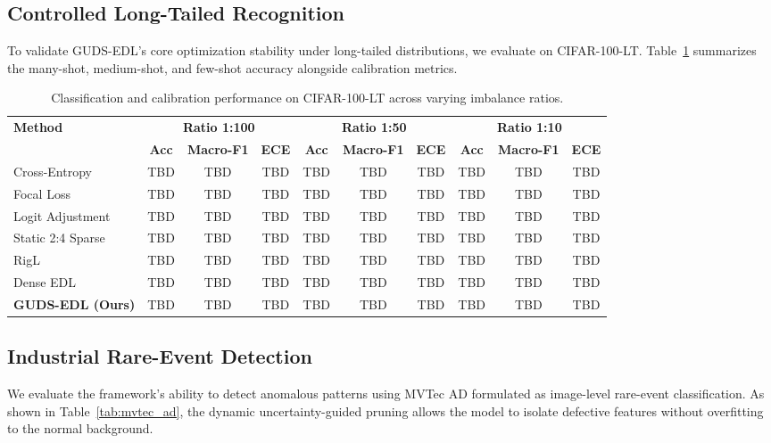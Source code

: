 \documentclass[letterpaper]{article} %
\begin{document}
\subsection{Controlled Long-Tailed Recognition}\label{subsec:cifar_results}
To validate GUDS-EDL's core optimization stability under long-tailed distributions, we evaluate on CIFAR-100-LT. Table~\ref{tab:cifar100_lt} summarizes the many-shot, medium-shot, and few-shot accuracy alongside calibration metrics.

\begin{table}[!ht]
\centering
\caption{Classification and calibration performance on CIFAR-100-LT across varying imbalance ratios.}
\label{tab:cifar100_lt}
\begin{tabular}{l ccc ccc ccc}
\toprule
\textbf{Method} & \multicolumn{3}{c}{\textbf{Ratio 1:100}} & \multicolumn{3}{c}{\textbf{Ratio 1:50}} & \multicolumn{3}{c}{\textbf{Ratio 1:10}} \\
\cmidrule(lr){2-4} \cmidrule(lr){5-7} \cmidrule(lr){8-10}
 & \textbf{Acc} & \textbf{Macro-F1} & \textbf{ECE} & \textbf{Acc} & \textbf{Macro-F1} & \textbf{ECE} & \textbf{Acc} & \textbf{Macro-F1} & \textbf{ECE} \\
\midrule
Cross-Entropy      & TBD & TBD & TBD & TBD & TBD & TBD & TBD & TBD & TBD \\
Focal Loss         & TBD & TBD & TBD & TBD & TBD & TBD & TBD & TBD & TBD \\
Logit Adjustment   & TBD & TBD & TBD & TBD & TBD & TBD & TBD & TBD & TBD \\
Static 2:4 Sparse  & TBD & TBD & TBD & TBD & TBD & TBD & TBD & TBD & TBD \\
RigL               & TBD & TBD & TBD & TBD & TBD & TBD & TBD & TBD & TBD \\
Dense EDL          & TBD & TBD & TBD & TBD & TBD & TBD & TBD & TBD & TBD \\
\midrule
\textbf{GUDS-EDL (Ours)} & TBD & TBD & TBD & TBD & TBD & TBD & TBD & TBD & TBD \\
\bottomrule
\end{tabular}
\end{table}

\subsection{Industrial Rare-Event Detection}\label{subsec:mvtec_results}
We evaluate the framework's ability to detect anomalous patterns using MVTec AD formulated as image-level rare-event classification. As shown in Table~\ref{tab:mvtec_ad}, the dynamic uncertainty-guided pruning allows the model to isolate defective features without overfitting to the normal background.
\end{document}
